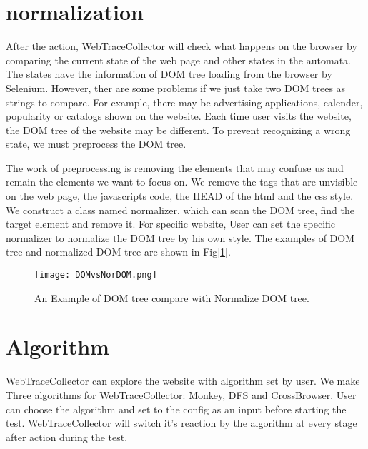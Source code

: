 \clearpage

\section{normalization}

After the action, WebTraceCollector will check what happens on the browser by comparing the current state of the web page and other states in the automata.
The states have the information of DOM tree loading from the browser by Selenium.
However, ther are some problems if we just take two DOM trees as strings to compare.
For example, there may be advertising applications, calender, popularity or catalogs shown on the website.
Each time user visits the website, the DOM tree of the website may be different.
To prevent recognizing a wrong state, we must preprocess the DOM tree.

The work of preprocessing is removing the elements that may confuse us and remain the elements we want to focus on.
We remove the tags that are unvisible on the web page, the javascripts code, the HEAD of the html and the css style.
We construct a class named normalizer, which can scan the DOM tree, find the target element and remove it.
For specific website, User can set the specific normalizer to normalize the DOM tree by his own style.
The examples of DOM tree and normalized DOM tree are shown in Fig[\ref{DOMvsNorDOM}].


\begin{figure}[h]
	\graphicspath{{pic/}}
	\begin{center}
		\texttt{[image: DOMvsNorDOM.png]}
	\end{center}
	\caption{An Example of DOM tree compare with Normalize DOM tree. }
	\label{DOMvsNorDOM}
\end{figure}

\clearpage

\section{Algorithm}

WebTraceCollector can explore the website with algorithm set by user.
We make Three algorithms for WebTraceCollector: Monkey, DFS and CrossBrowser.
User can choose the algorithm and set to the config as an input before starting the test.
WebTraceCollector will switch it's reaction by the algorithm at every stage after action during the test.

